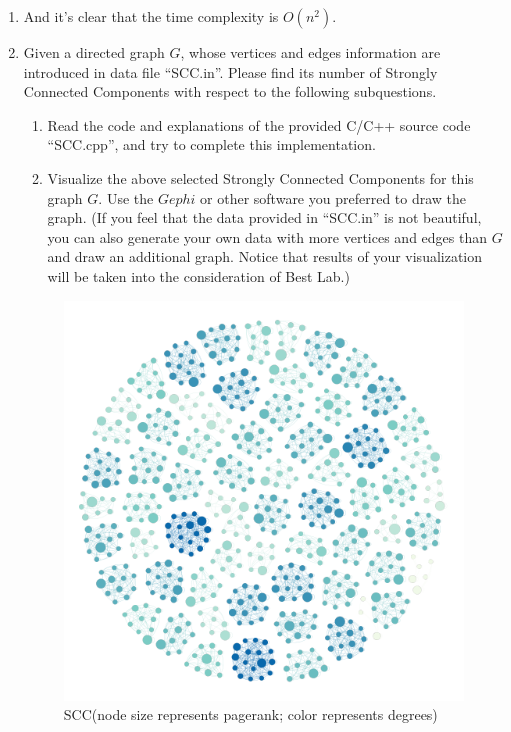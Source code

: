 \documentclass[12pt,a4paper]{article}
\makeatletter
\newtheorem*{solution}{Solution}
\theoremstyle{definition}
\renewenvironment{solution}[1][Solution] {\par\pushQED{\qed}\normalfont\topsep6\p@\@plus6\p@\relax\trivlist\item[\hskip\labelsep\bfseries#1\@addpunct{.}]\ignorespaces}{\popQED\endtrivlist\@endpefalse} \makeatother
\makeatother
\begin{document}
\begin{enumerate}
\begin{solution}
\begin{algorithm}[H]
{            }
        \end{algorithm}
    And it's clear that the time complexity is $O(n^2)$.
    \end{solution}

	\item Given a directed graph $G$, whose vertices and edges information are introduced in data file ``SCC.in''. Please find its number of Strongly Connected Components with respect to the following subquestions.
    \begin{enumerate}
    	\item Read the code and explanations of the provided C/C++ source code ``SCC.cpp'', and try to complete this implementation.
    	\item Visualize the above selected Strongly Connected Components for this graph $G$. Use the $Gephi$ or other software you preferred to draw the graph. {\color{blue}(If you feel that the data provided in ``SCC.in'' is not beautiful, you can also generate your own data with more vertices and edges than $G$ and draw an additional graph. Notice that results of your visualization will be taken into the consideration of Best Lab.)}

    \end{enumerate}

        \begin{figure}[H]
            \centering
            \includegraphics[width=.8\textwidth]{1.png} 
            \caption{SCC(node size represents pagerank; color represents degrees)} 
          \end{figure}


\end{enumerate}
\end{document}
